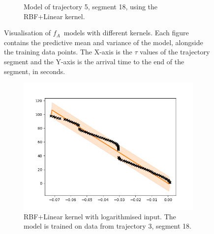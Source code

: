 \begin{figure}
\begin{subfigure}[b]{0.475\textwidth}
            \caption[]%
            {{\small Model of trajectory 5, segment 18, using the RBF+Linear kernel.}}    
            \label{fig:5-18-rbf-linear}
        \end{subfigure}
        \caption[ Visualisation of $f_A$ models with different kernels ]
        {{\small Visualisation of $f_A$ models with different kernels.
        Each figure contains the predictive mean and variance of the model, alongside the training data points.  
        The X-axis is the $\tau$ values of the trajectory segment and the Y-axis is the arrival time to the end of the segment, in seconds.}} 
        \label{fig:5-18-3-18-models}
    \end{figure}

\begin{figure}
    \centering
    \begin{subfigure}[b]{0.475\textwidth}   
        \centering
        \includegraphics[width=\textwidth]{figures/forecasting/gp_3_18_rbf_linear_log}
        \caption[RBF+Linear kernel with logarithmised input.]%
        {{\small RBF+Linear kernel with logarithmised input. 
        The model is trained on data from trajectory 3, segment 18.
        }}
        \label{fig:3-18-log}
    \end{subfigure}
    \quad
    \begin{subfigure}[b]{0.475\textwidth}   
        \centering 

\end{subfigure}
\end{figure}
